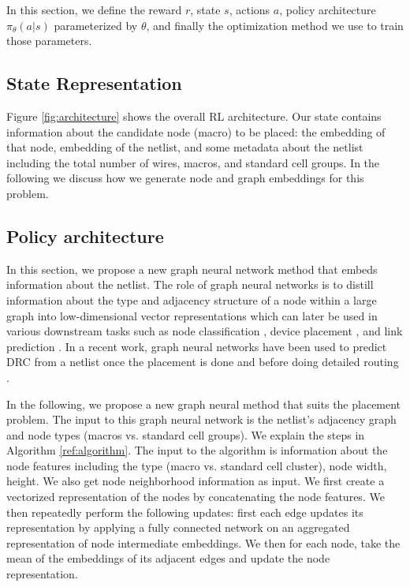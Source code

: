 In this section, we define the reward $r$, state $s$, actions $a$, policy architecture $\pi_{\theta}(a|s)$ parameterized by $\theta$, and finally the optimization method we use to train those parameters.

\subsection{State Representation}
Figure \ref{fig:architecture} shows the overall RL architecture. Our state contains information about the candidate node (macro) to be placed: the embedding of that node, embedding of the netlist, and some metadata about the netlist including the total number of wires, macros, and standard cell groups. In the following we discuss how we generate node and graph embeddings for this problem.


\subsection{Policy architecture} In this section, we propose a new graph neural network method that embeds information about the netlist. The role of graph neural networks is to distill information about the type and adjacency structure of a node within a large graph into low-dimensional vector representations which can later be used in various downstream tasks such as node classification \citep{}, device placement \citep{}, and link prediction \citep{}. In a recent work, graph neural networks have been used to predict DRC from a netlist once the placement is done and before doing detailed routing \citep{}.

In the following, we propose a new graph neural method that suits the placement problem. The input to this graph neural network is the netlist's adjacency graph and node types (macros vs. standard cell groups). We explain the steps in Algorithm \ref{ref:algorithm}. The input to the algorithm is information about the node features including the type (macro vs. standard cell cluster), node width, height. We also get node neighborhood information as input. We first create a vectorized representation of the nodes by concatenating the node features. We then repeatedly perform the following updates: first each edge updates its representation by applying a fully connected network on an aggregated representation of node intermediate embeddings. We then for each node, take the mean of the embeddings of its adjacent edges and update the node representation.
 
\begin{algorithm}[H]
\label{ref:algorithm}
\SetAlgoLined
\KwResult{}
 initialization: netlist's adjacency graph and node types (macros vs. standard cell groups)
 Node are represented with $v_i's$ for $1<=i<=N$\;
 }
 \caption{Edge based graph neural network embedding.}
\end{algorithm}


